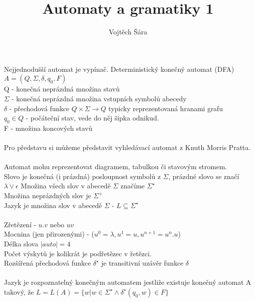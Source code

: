 \documentclass{article}
\title{Automaty a gramatiky 1}
\author{Vojtěch Šára}
\begin{document}
\maketitle
Nejjednodušší automat je vypínač. 
Deterministický konečný automat (DFA) $A = (Q,\Sigma, \delta, q_{0},F)$\\
Q - konečná neprázdná množina stavů\\
$\Sigma$ - konečná neprázdná množina vstupních symbolů abecedy\\
$\delta$ - přechodová funkce $Q \times \Sigma \rightarrow Q$ typicky reprezentovaná hranami grafu\\
$q_{0} \in Q$ - počáteční stav, vede do něj šipka odnikud.\\
F - množina koncových stavů\\\\

Pro představu si můžeme představit vyhledávací automat z Knuth Morris Pratta.\\\\

Automat mohu reprezentovat diagramem, tabulkou či stavovým stromem.\\

Slovo je konečná (i prázdná) posloupnost symbolů z $\Sigma$, prázdné slovo se značí $\lambda \vee \epsilon$
Množina všech slov v abecedě $\Sigma$ značíme $\Sigma^{\star}$\\
Množina neprázdných slov je $\Sigma^{+}$\\
Jazyk je množina slov v abecedě $\Sigma$ - $L \subseteq \Sigma^{\star}$\\\\

Zřetězení - $u.v$ nebo $uv$\\
Mocnina (jen přirozenými) - ($u^{0} = \lambda, u^{1} = u, u^{n+1} = u^{n}.u$)\\
Délka slova $|auto| = 4$\\
Počet výskytů je kolikrát je podřetězec v řetězci.\\

Rozšířená přechodová funkce $\delta^{\star}$ je transitivní uzávěr funkce $\delta$\\\\

Jazyk je rozpoznatelný konečným automatem jestliže existuje konečný automat A takový,
že  $L = L(A) = \{w | w \in \Sigma^{\star} \wedge \delta^{\star}(q_{0},w) \in F\}$\\\\
\end{document}
